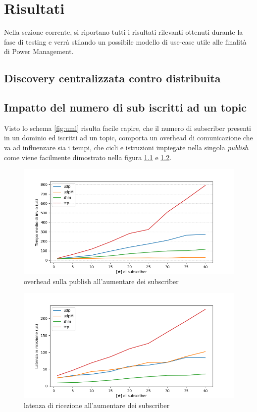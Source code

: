 \chapter{Risultati}%

Nella sezione corrente, si riportano tutti i risultati rilevanti ottenuti durante la fase di testing e verrà stilando un possibile modello di use-case utile alle finalità di Power Management.
\section{Discovery centralizzata contro distribuita}

\section{Impatto del numero di sub iscritti ad un topic}
Visto lo schema \ref{fig:uml} risulta facile capire, che il numero di subscriber presenti in un dominio ed iscritti ad un topic, comporta un overhead di comunicazione che va ad influenzare sia i tempi, che cicli e istruzioni impiegate nella singola \emph{publish} come viene facilmente dimostrato nella figura \ref{fig:test3_overhead} e \ref{fig:test3_latenza}.
\begin{figure}[H]
    \centering
    \includegraphics[width=\textwidth]{./results/test3_sending_multiplesub.png} %
    \caption{overhead sulla publish all'aumentare dei subscriber}
    \label{fig:test3_overhead}
\end{figure}
\begin{figure}[H]
    \centering
    \includegraphics[width=\textwidth]{./results/test3_sendingreceiving_multiplesub.png} 
    \caption{latenza di ricezione all'aumentare dei subscriber}
    \label{fig:test3_latenza}
\end{figure}

